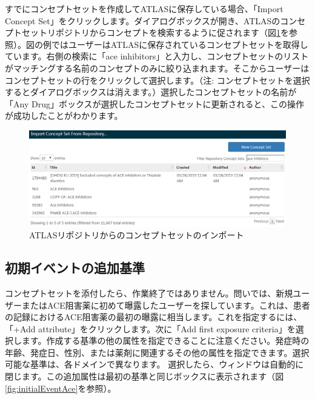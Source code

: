 \documentclass[
  11pt]{book}
\theoremstyle{definition}
\theoremstyle{definition}
\theoremstyle{definition}
\theoremstyle{definition}
\theoremstyle{remark}
\begin{document}
すでにコンセプトセットを作成してATLASに保存している場合、「Import Concept Set」をクリックします。ダイアログボックスが開き、ATLASのコンセプトセットリポジトリからコンセプトを検索するように促されます（図\ref{fig:ATLASfindyourconcept}を参照）。図の例ではユーザーはATLASに保存されているコンセプトセットを取得しています。右側の検索に「ace inhibitors」と入力し、コンセプトセットのリストがマッチングする名前のコンセプトのみに絞り込まれます。そこからユーザーはコンセプトセットの行をクリックして選択します。（注: コンセプトセットを選択するとダイアログボックスは消えます。）選択したコンセプトセットの名前が「Any Drug」ボックスが選択したコンセプトセットに更新されると、この操作が成功したことがわかります。

\begin{figure}

{\centering \includegraphics[width=1\linewidth]{images/Cohorts/ATLAS-findingyourconcept} 

}

\caption{ATLASリポジトリからのコンセプトセットのインポート}\label{fig:ATLASfindyourconcept}
\end{figure}

\subsection{初期イベントの追加基準}\label{ux521dux671fux30a4ux30d9ux30f3ux30c8ux306eux8ffdux52a0ux57faux6e96}

コンセプトセットを添付したら、作業終了ではありません。問いでは、新規ユーザーまたはACE阻害薬に初めて曝露したユーザーを探しています。これは、患者の記録におけるACE阻害薬の最初の曝露に相当します。これを指定するには、「+Add attribute」をクリックします。次に「Add first exposure criteria」を選択します。作成する基準の他の属性を指定できることに注意ください。発症時の年齢、発症日、性別、または薬剤に関連するその他の属性を指定できます。選択可能な基準は、各ドメインで異なります。 選択したら、ウィンドウは自動的に閉じます。この追加属性は最初の基準と同じボックスに表示されます（図\ref{fig:initialEventAce}を参照）。
\end{document}
